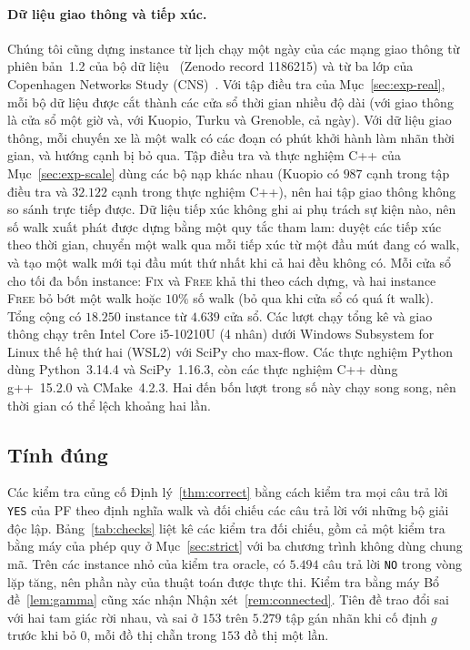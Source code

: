 \documentclass[pdflatex,sn-mathphys-num]{sn-jnl}
\theoremstyle{thmstyleone}%
\theoremstyle{thmstyletwo}%
\theoremstyle{thmstylethree}%
\newcommand{\FIX}{\textup{\textsc{Fix}}}
\newcommand{\FREE}{\textup{\textsc{Free}}}
\newcommand{\YES}{\texttt{YES}}
\newcommand{\NO}{\texttt{NO}}
\begin{document}
\paragraph{Dữ liệu giao thông và tiếp xúc.} Chúng tôi cũng dựng instance từ lịch chạy một ngày của các mạng giao thông từ phiên bản~1.2 của bộ dữ liệu~\cite{kujala2018} (Zenodo record 1186215) và từ ba lớp của Copenhagen Networks Study (CNS)~\cite{sapiezynski2019}. Với tập điều tra của Mục~\ref{sec:exp-real}, mỗi bộ dữ liệu được cắt thành các cửa sổ thời gian nhiều độ dài (với giao thông là cửa sổ một giờ và, với Kuopio, Turku và Grenoble, cả ngày). Với dữ liệu giao thông, mỗi chuyến xe là một walk có các đoạn có phút khởi hành làm nhãn thời gian, và hướng cạnh bị bỏ qua. Tập điều tra và thực nghiệm C++ của Mục~\ref{sec:exp-scale} dùng các bộ nạp khác nhau (Kuopio có $987$ cạnh trong tập điều tra và $32.122$ cạnh trong thực nghiệm C++), nên hai tập giao thông không so sánh trực tiếp được. Dữ liệu tiếp xúc không ghi ai phụ trách sự kiện nào, nên số walk xuất phát được dựng bằng một quy tắc tham lam: duyệt các tiếp xúc theo thời gian, chuyển một walk qua mỗi tiếp xúc từ một đầu mút đang có walk, và tạo một walk mới tại đầu mút thứ nhất khi cả hai đều không có. Mỗi cửa sổ cho tối đa bốn instance: \FIX{} và \FREE{} khả thi theo cách dựng, và hai instance \FREE{} bỏ bớt một walk hoặc $10\%$ số walk (bỏ qua khi cửa sổ có quá ít walk). Tổng cộng có $18.250$ instance từ $4.639$ cửa sổ. Các lượt chạy tổng kê và giao thông chạy trên Intel Core i5-10210U (4 nhân) dưới Windows Subsystem for Linux thế hệ thứ hai (WSL2) với SciPy cho max-flow. Các thực nghiệm Python dùng Python~3.14.4 và SciPy~1.16.3, còn các thực nghiệm C++ dùng g++~15.2.0 và CMake~4.2.3. Hai đến bốn lượt trong số này chạy song song, nên thời gian có thể lệch khoảng hai lần.

\subsection{Tính đúng}\label{sec:exp-correct}

Các kiểm tra củng cố Định lý~\ref{thm:correct} bằng cách kiểm tra mọi câu trả lời \YES{} của PF theo định nghĩa walk và đối chiếu các câu trả lời với những bộ giải độc lập. Bảng~\ref{tab:checks} liệt kê các kiểm tra đối chiếu, gồm cả một kiểm tra bằng máy của phép quy ở Mục~\ref{sec:strict} với ba chương trình không dùng chung mã. Trên các instance nhỏ của kiểm tra oracle, có $5.494$ câu trả lời \NO{} trong vòng lặp tăng, nên phần này của thuật toán được thực thi. Kiểm tra bằng máy Bổ đề~\ref{lem:gamma} cũng xác nhận Nhận xét~\ref{rem:connected}. Tiên đề trao đổi sai với hai tam giác rời nhau, và sai ở $153$ trên $5.279$ tập gán nhãn khi cố định $g$ trước khi bỏ $0$, mỗi đồ thị chẵn trong $153$ đồ thị một lần.
\end{document}
